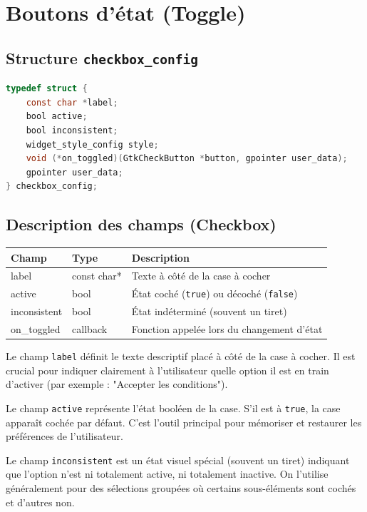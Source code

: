 \bigskip
\section{Boutons d'état (Toggle)}


\subsection{Structure \texttt{checkbox\_config}}
\begin{lstlisting}[language=C]
typedef struct {
    const char *label;
    bool active;
    bool inconsistent;
    widget_style_config style;
    void (*on_toggled)(GtkCheckButton *button, gpointer user_data);
    gpointer user_data;
} checkbox_config;
\end{lstlisting}

\subsection{Description des champs (Checkbox)}
\begin{center}
\begin{tabular}{|l|l|p{5cm}|}
\hline
\textbf{Champ} & \textbf{Type} & \textbf{Description} \\
\hline
label & const char* & Texte à côté de la case à cocher \\
\hline
active & bool & État coché (\texttt{true}) ou décoché (\texttt{false}) \\
\hline
inconsistent & bool & État indéterminé (souvent un tiret) \\
\hline
on\_toggled & callback & Fonction appelée lors du changement d'état \\
\hline
\end{tabular}
\end{center}

Le champ \texttt{label} définit le texte descriptif placé à côté de la case à cocher. Il est crucial pour indiquer clairement à l'utilisateur quelle option il est en train d'activer (par exemple : "Accepter les conditions").

Le champ \texttt{active} représente l'état booléen de la case. S'il est à \texttt{true}, la case apparaît cochée par défaut. C'est l'outil principal pour mémoriser et restaurer les préférences de l'utilisateur.

Le champ \texttt{inconsistent} est un état visuel spécial (souvent un tiret) indiquant que l'option n'est ni totalement active, ni totalement inactive. On l'utilise généralement pour des sélections groupées où certains sous-éléments sont cochés et d'autres non.

